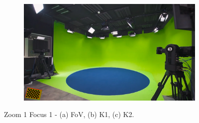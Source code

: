 \begin{figure}[h]
    \begin{subfigure}[b]{0.45\textwidth}
        \includegraphics[width=\textwidth]{Images/08annex/results/1.4.png}
        \caption{}
        \label{fig:c2}
    \end{subfigure}

    \caption{Zoom 1 Focus 1 - (a) FoV, (b) K1, (c) K2.}
    \label{fig:vir_fov_cal}
\end{figure}


